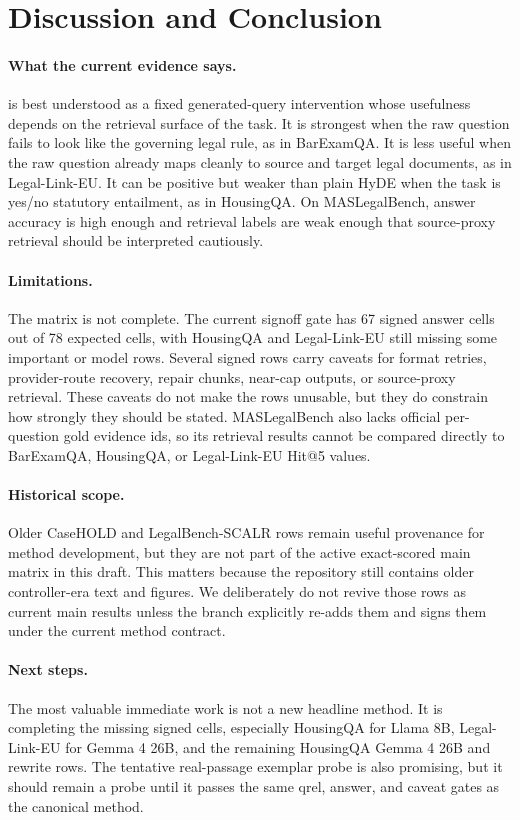 \section{Discussion and Conclusion}\label{sec:conclusion}

\paragraph{What the current evidence says.}
\hyre{} is best understood as a fixed generated-query intervention whose
usefulness depends on the retrieval surface of the task. It is strongest when
the raw question fails to look like the governing legal rule, as in BarExamQA.
It is less useful when the raw question already maps cleanly to source and
target legal documents, as in Legal-Link-EU. It can be positive but weaker than
plain HyDE when the task is yes/no statutory entailment, as in HousingQA. On
MASLegalBench, answer accuracy is high enough and retrieval labels are weak
enough that source-proxy retrieval should be interpreted cautiously.

\paragraph{Limitations.}
The matrix is not complete. The current signoff gate has 67 signed answer
cells out of 78 expected cells, with HousingQA and Legal-Link-EU still missing
some important \hyre{} or model rows. Several signed rows carry caveats for
format retries, provider-route recovery, repair chunks, near-cap outputs, or
source-proxy retrieval. These caveats do not make the rows unusable, but they
do constrain how strongly they should be stated. MASLegalBench also lacks
official per-question gold evidence ids, so its retrieval results cannot be
compared directly to BarExamQA, HousingQA, or Legal-Link-EU Hit@5 values.

\paragraph{Historical scope.}
Older CaseHOLD and LegalBench-SCALR rows remain useful provenance for method
development, but they are not part of the active exact-scored main matrix in
this draft. This matters because the repository still contains older
controller-era text and figures. We deliberately do not revive those rows as
current main results unless the branch explicitly re-adds them and signs them
under the current method contract.

\paragraph{Next steps.}
The most valuable immediate work is not a new headline method. It is completing
the missing signed cells, especially HousingQA \hyre{} for Llama 8B,
Legal-Link-EU \hyre{} for Gemma 4 26B, and the remaining HousingQA Gemma 4
26B and rewrite rows. The tentative real-passage exemplar probe is also
promising, but it should remain a probe until it passes the same qrel, answer,
and caveat gates as the canonical method.

